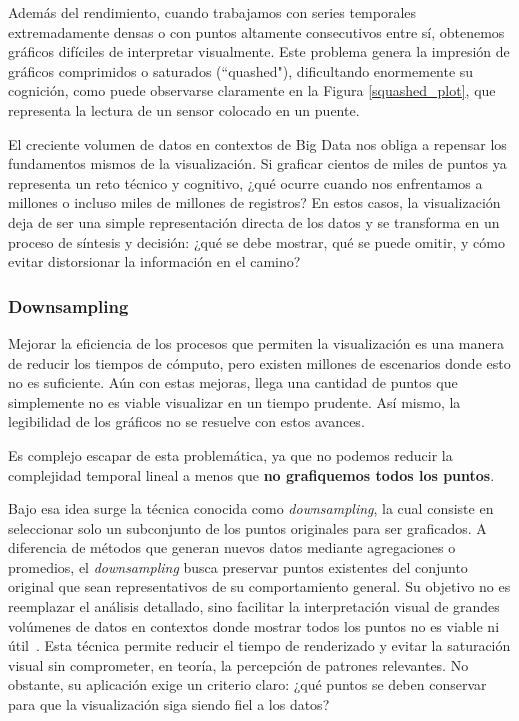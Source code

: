 Además del rendimiento, cuando trabajamos con series temporales extremadamente densas o con puntos altamente consecutivos entre sí, obtenemos gráficos difíciles de interpretar visualmente. Este problema genera la impresión de gráficos comprimidos o saturados (``quashed"), dificultando enormemente su cognición, como puede observarse claramente en la Figura \ref{squashed_plot}, que representa la lectura de un sensor colocado en un puente.

El creciente volumen de datos en contextos de Big Data nos obliga a repensar los fundamentos mismos de la visualización. Si graficar cientos de miles de puntos ya representa un reto técnico y cognitivo, ¿qué ocurre cuando nos enfrentamos a millones o incluso miles de millones de registros? En estos casos, la visualización deja de ser una simple representación directa de los datos y se transforma en un proceso de síntesis y decisión: ¿qué se debe mostrar, qué se puede omitir, y cómo evitar distorsionar la información en el camino?


\subsubsection{Downsampling}

Mejorar la eficiencia de los procesos que permiten la visualización es una manera de reducir los tiempos de cómputo, pero existen millones de escenarios donde esto no es suficiente. Aún con estas mejoras, llega una cantidad de puntos que simplemente no es viable visualizar en un tiempo prudente. Así mismo, la legibilidad de los gráficos no se resuelve con estos avances.

Es complejo escapar de esta problemática, ya que no podemos reducir la complejidad temporal lineal a menos que \textbf{no grafiquemos todos los puntos}.

Bajo esa idea surge la técnica conocida como \textit{downsampling}, la cual consiste en seleccionar solo un subconjunto de los puntos originales para ser graficados. A diferencia de métodos que generan nuevos datos mediante agregaciones o promedios, el \textit{downsampling} busca preservar puntos existentes del conjunto original que sean representativos de su comportamiento general. Su objetivo no es reemplazar el análisis detallado, sino facilitar la interpretación visual de grandes volúmenes de datos en contextos donde mostrar todos los puntos no es viable ni útil~\cite{steinarsson2013downsampling}. Esta técnica permite reducir el tiempo de renderizado y evitar la saturación visual sin comprometer, en teoría, la percepción de patrones relevantes. No obstante, su aplicación exige un criterio claro: ¿qué puntos se deben conservar para que la visualización siga siendo fiel a los datos?

